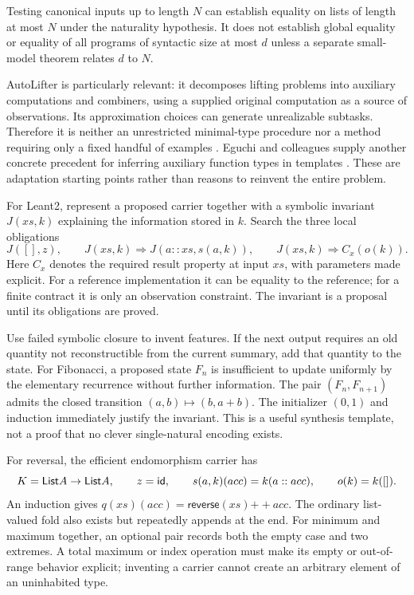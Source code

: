 Testing canonical inputs up to length $N$ can establish equality on lists of
length at most $N$ under the naturality hypothesis. It does not establish
global equality or equality of all programs of syntactic size at most $d$
unless a separate small-model theorem relates $d$ to $N$.


AutoLifter is particularly relevant: it decomposes lifting problems into
auxiliary computations and combiners, using a supplied original computation
as a source of observations. Its approximation choices can generate
unrealizable subtasks. Therefore it is neither an unrestricted minimal-type
procedure nor a method requiring only a fixed handful of examples
\cite{autolifter}. Eguchi and colleagues supply another concrete precedent
for inferring auxiliary function types in templates \cite{eguchi}. These are
adaptation starting points rather than reasons to reinvent the entire problem.

For Leant2, represent a proposed carrier together with a symbolic invariant
$J(xs,k)$ explaining the information stored in $k$. Search the three local
obligations
\[
 J([],z),\qquad
 J(xs,k)\Longrightarrow J(a::xs,s(a,k)),\qquad
 J(xs,k)\Longrightarrow C_x(o(k)).
 \tag{5}\label{eq:lift}
\]
Here $C_x$ denotes the required result property at input $xs$, with parameters
made explicit. For a reference implementation it can be equality to the
reference; for a finite contract it is only an observation constraint.
The invariant is a proposal until its obligations are proved.

Use failed symbolic closure to invent features. If the next output requires
an old quantity not reconstructible from the current summary, add that
quantity to the state. For Fibonacci, a proposed state $F_n$ is insufficient
to update uniformly by the elementary recurrence without further information.
The pair $(F_n,F_{n+1})$ admits the closed transition $(a,b)\mapsto(b,a+b)$.
The initializer $(0,1)$ and induction immediately justify the invariant.
This is a useful synthesis template, not a proof that no clever single-natural
encoding exists.

For reversal, the efficient endomorphism carrier has
\[
 K=\mathsf{List} A\to\mathsf{List} A,\qquad z=\mathsf{id},\qquad
 s(a,k)(acc)=k(a::acc),\qquad o(k)=k([]).
\]
An induction gives $q(xs)(acc)=\mathsf{reverse}(xs)\mathbin{+\!+}acc$.
The ordinary list-valued fold also exists but repeatedly appends at the end.
For minimum and maximum together, an optional pair records both the empty
case and two extremes. A total maximum or index operation must make its empty
or out-of-range behavior explicit; inventing a carrier cannot create an
arbitrary element of an uninhabited type.

